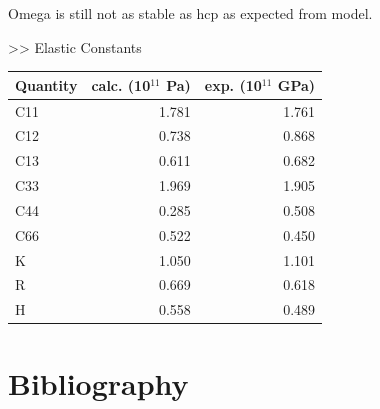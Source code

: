 \documentclass[11pt]{article}
\begin{document}
Omega is still not as stable as hcp as expected from model. 


>> Elastic Constants

\begin{center}
\begin{tabular}{lrr}
Quantity & calc. (10\(^{\text{11}}\) Pa) & exp. (10\(^{\text{11}}\) GPa)\\
\hline
C11 & 1.781 & 1.761\\
C12 & 0.738 & 0.868\\
C13 & 0.611 & 0.682\\
C33 & 1.969 & 1.905\\
C44 & 0.285 & 0.508\\
C66 & 0.522 & 0.450\\
K & 1.050 & 1.101\\
R & 0.669 & 0.618\\
H & 0.558 & 0.489\\
\end{tabular}
\end{center}

\section{Bibliography}
\label{sec:orga3d32e3}
\label{orgb182b2d}



\end{document}
